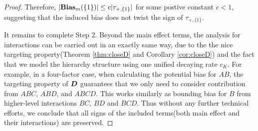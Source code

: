 \documentclass[12pt]{article}
\begin{document}
\begin{proof}
Therefore, $|\text{\textbf{Bias}}_m(\{1\})|\le c|{\tau}_{+,\{1\}}|$ for some postive constant $c<1$, suggesting that the induced bias does not twist the sign of ${\tau}_{+,\{1\}}$.

It remains to complete Step 2.  Beyond the main effect terms, the analysis for interactions can be carried out in an exactly same way, due to the the nice targeting property(Theorem \ref{thm:closeD} and Corollary \ref{cor:closeD}) and the fact that we model the hierarchy structure using one unified decaying rate $c_K$. For example, in a four-factor case, when calculating the potential bias for $AB$, the targeting property of ${\boldsymbol{D}}$ guarantees that we only need to consider contribution from $ABC$, $ABD$, and $ABCD$. This works similarly as bounding bias for $B$ from higher-level interactions $BC$, $BD$ and $BCD$. Thus without any further technical efforts, we conclude that all signs of the included terms(both main effect and their interactions) are preserved. 


\end{proof}
\end{document}
